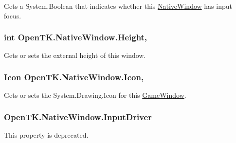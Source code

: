 Gets a System.\-Boolean that indicates whether this \hyperlink{class_open_t_k_1_1_native_window}{Native\-Window} has input focus. 

\hypertarget{class_open_t_k_1_1_native_window_afc84f4b20f80301bc41c3511763c3917}{
\subsubsection[{Height}]{\setlength{\rightskip}{0pt plus 5cm}int Open\-T\-K.\-Native\-Window.\-Height\hspace{0.3cm}{\ttfamily [get]}, {\ttfamily [set]}}}\label{class_open_t_k_1_1_native_window_afc84f4b20f80301bc41c3511763c3917}


Gets or sets the external height of this window. 

\hypertarget{class_open_t_k_1_1_native_window_a6cb12235c07f51662905a238baf65f2d}{
\subsubsection[{Icon}]{\setlength{\rightskip}{0pt plus 5cm}Icon Open\-T\-K.\-Native\-Window.\-Icon\hspace{0.3cm}{\ttfamily [get]}, {\ttfamily [set]}}}\label{class_open_t_k_1_1_native_window_a6cb12235c07f51662905a238baf65f2d}


Gets or sets the System.\-Drawing.\-Icon for this \hyperlink{class_open_t_k_1_1_game_window}{Game\-Window}. 

\hypertarget{class_open_t_k_1_1_native_window_a9c19a3cff0a4f0ce60885c8dc6f4a89c}{
\subsubsection[{Input\-Driver}]{ Open\-T\-K.\-Native\-Window.\-Input\-Driver\hspace{0.3cm}{\ttfamily [get]}}}\label{class_open_t_k_1_1_native_window_a9c19a3cff0a4f0ce60885c8dc6f4a89c}


This property is deprecated. 

